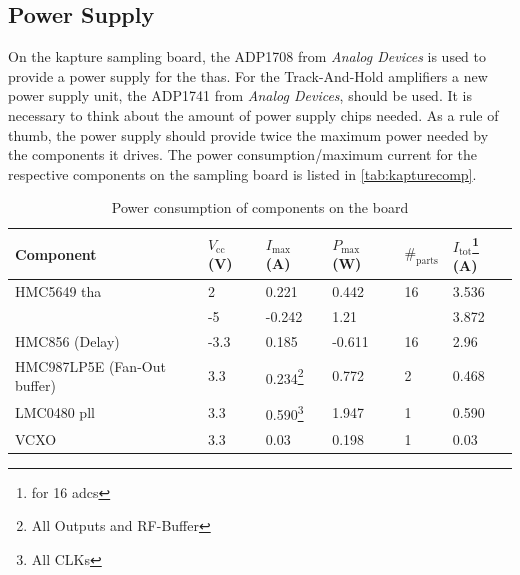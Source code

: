 \subsection{Power Supply}
On the \gls{kapture} sampling board, the ADP1708 from \textit{Analog Devices} is used to provide a power supply for the \glspl{tha}. 
For the Track-And-Hold amplifiers a new power supply unit, the ADP1741 from \textit{Analog Devices}, should be used. It is necessary to think about the amount of power supply chips needed.
As a rule of thumb, the power supply should provide twice the maximum power needed by the components it drives. \cite{michele}
The power consumption/maximum current for the respective components on the sampling board is listed in \autoref{tab:kapturecomp}. 

\begin{table}[tbh]
	\caption{Power consumption of components on the board}
	\label{tab:kapturecomp}
	\begin{minipage}{\textwidth}
		\centering
		\begin{tabularx}{\textwidth}{Xlllll}
			\toprule
			\textbf{Component}          & $V_\text{cc}$ (V) & $I_\text{max}$ (A)                        & $P_\text{max}$ (W) & $\#_\text{parts}$ & $I_\text{tot}$\footnote{for 16 \glspl{adc}} (A) \\ \midrule
			HMC5649 \gls{tha}           & 2                 & 0.221                                     & 0.442              & 16                & 3.536                                           \\
			                            & -5                & -0.242                                    & 1.21               &                   & 3.872                                           \\
			HMC856 (Delay)              & -3.3              & 0.185                                     & -0.611             & 16                & 2.96                                            \\
			HMC987LP5E (Fan-Out buffer) & 3.3               & 0.234\footnote{All Outputs and RF-Buffer} & 0.772              & 2                 & 0.468                                           \\
			LMC0480 \gls{pll}           & 3.3               & 0.590\footnote{All CLKs}                  & 1.947              & 1                 & 0.590                                           \\
			VCXO                        & 3.3               & 0.03                                      & 0.198              & 1                 & 0.03                                            \\ \bottomrule
		\end{tabularx}
	\end{minipage}
\end{table}

